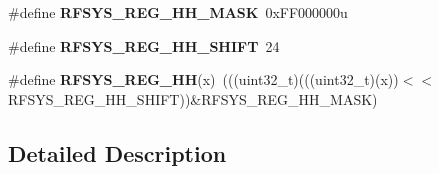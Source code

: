 \begin{DoxyCompactItemize}
\item 
\#define {\bfseries R\+F\+S\+Y\+S\+\_\+\+R\+E\+G\+\_\+\+H\+H\+\_\+\+M\+A\+SK}~0x\+F\+F000000u\hypertarget{group__RFSYS__Register__Masks_gae1fb55483b3d79a2e74d0c1ad4e57d51}{}\label{group__RFSYS__Register__Masks_gae1fb55483b3d79a2e74d0c1ad4e57d51}

\item 
\#define {\bfseries R\+F\+S\+Y\+S\+\_\+\+R\+E\+G\+\_\+\+H\+H\+\_\+\+S\+H\+I\+FT}~24\hypertarget{group__RFSYS__Register__Masks_gae78b067bd28db1d0ff57015f300312fb}{}\label{group__RFSYS__Register__Masks_gae78b067bd28db1d0ff57015f300312fb}

\item 
\#define {\bfseries R\+F\+S\+Y\+S\+\_\+\+R\+E\+G\+\_\+\+HH}(x)~(((uint32\+\_\+t)(((uint32\+\_\+t)(x))$<$$<$R\+F\+S\+Y\+S\+\_\+\+R\+E\+G\+\_\+\+H\+H\+\_\+\+S\+H\+I\+FT))\&R\+F\+S\+Y\+S\+\_\+\+R\+E\+G\+\_\+\+H\+H\+\_\+\+M\+A\+SK)\hypertarget{group__RFSYS__Register__Masks_ga9724177c60594bb3a22f13e9ef7de07c}{}\label{group__RFSYS__Register__Masks_ga9724177c60594bb3a22f13e9ef7de07c}

\end{DoxyCompactItemize}


\subsection{Detailed Description}
